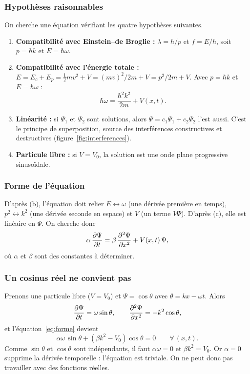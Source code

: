 \subsubsection{Hypothèses raisonnables}

On cherche une équation vérifiant les quatre hypothèses suivantes.

\begin{enumerate}[label=(\alph*)]
  \item \textbf{Compatibilité avec Einstein--de Broglie :}
        $\lambda = h/p$ et $f = E/h$, soit $p = \hbar k$ et $E = \hbar\omega$.
  \item \textbf{Compatibilité avec l'énergie totale :}
        $E = E_c + E_p = \tfrac12 mv^2 + V = (mv)^2/2m + V = p^2/2m + V$.
        Avec $p = \hbar k$ et $E = \hbar\omega$ :
        \begin{equation}\label{eq:R}
          \hbar\omega = \frac{\hbar^2k^2}{2m} + V(x,t).
        \end{equation}
  \item \textbf{Linéarité :} si $\Psi_1$ et $\Psi_2$ sont solutions, alors
        $\Psi = c_1\Psi_1 + c_2\Psi_2$ l'est aussi. C'est le principe de
        superposition, source des interférences constructives et destructives
        (figure~\ref{fig:interferences}).
  \item \textbf{Particule libre :} si $V = V_0$, la solution est une onde plane
        progressive sinusoïdale.
\end{enumerate}

\subsubsection{Forme de l'équation}

D'après (b), l'équation doit relier $E \leftrightarrow \omega$ (une dérivée
première en temps), $p^2 \leftrightarrow k^2$ (une dérivée seconde en espace) et
$V$ (un terme $V\Psi$). D'après (c), elle est linéaire en $\Psi$. On cherche donc
\begin{equation}\label{eq:forme}
  \alpha\,\dfrac{\partial \Psi}{\partial t} = \beta\,\dfrac{\partial^{2} \Psi}{\partial x^{2}} + V(x,t)\,\Psi ,
\end{equation}
où $\alpha$ et $\beta$ sont des constantes à déterminer.

\subsubsection{Un cosinus réel ne convient pas}

Prenons une particule libre ($V=V_0$) et $\Psi = \cos\theta$ avec
$\theta = kx-\omega t$. Alors
\[
  \dfrac{\partial \Psi}{\partial t} = \omega\sin\theta,
  \qquad
  \dfrac{\partial^{2} \Psi}{\partial x^{2}} = -k^2\cos\theta ,
\]
et l'équation~\eqref{eq:forme} devient
\[
  \alpha\omega\,\sin\theta + (\beta k^2 - V_0)\cos\theta = 0
  \qquad \forall\,(x,t).
\]
Comme $\sin\theta$ et $\cos\theta$ sont indépendants, il faut
$\alpha\omega = 0$ et $\beta k^2 = V_0$. Or $\alpha = 0$ supprime la dérivée
temporelle : l'équation est triviale. On ne peut donc pas travailler avec des
fonctions réelles.

